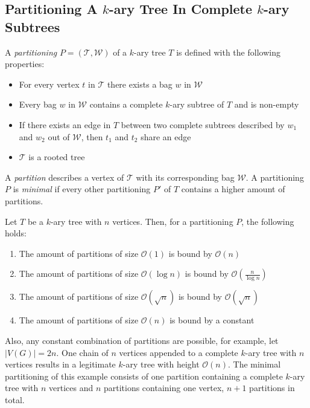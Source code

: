 \subsection{Partitioning A $k$-ary Tree In Complete $k$-ary Subtrees}
\begin{definition}
	A \emph{partitioning} $P = (\mathcal{T},\mathcal{W})$ of a $k$-ary tree $T$ is defined with the following properties:
	\begin{itemize}
		\item For every vertex $t$ in $\mathcal{T}$ there exists a bag $w$ in $\mathcal{W}$
		\item Every bag $w$ in $\mathcal{W}$ contains a complete $k$-ary subtree of $T$ and is non-empty
		\item If there exists an edge in $T$ between two complete subtrees described by $w_1$ and $w_2$ out of $\mathcal{W}$, then $t_1$ and $t_2$ share an edge
		\item $\mathcal{T}$ is a rooted tree		
	\end{itemize}
	A \emph{partition} describes a vertex of $\mathcal{T}$ with its corresponding bag $\mathcal{W}$. A partitioning $P$ is \emph{minimal} if every other partitioning $P'$ of $T$ contains a higher amount of partitions.
\end{definition}
Let $T$ be a $k$-ary tree with $n$ vertices. Then, for a partitioning $P$, the following holds:
\begin{enumerate}
	\item The amount of partitions of size $\mathcal{O}(1)$ is bound by $\mathcal{O}(n)$
	\item The amount of partitions of size $\mathcal{O}(\log n)$ is bound by $\mathcal{O}\left(\frac{n}{\log n}\right)$
	\item The amount of partitions of size $\mathcal{O}(\sqrt{n})$ is bound by $\mathcal{O}(\sqrt{n})$
	\item The amount of partitions of size $\mathcal{O}(n)$ is bound by a constant
\end{enumerate}
Also, any constant combination of partitions are possible, for example, let $|V(G)| = 2n$. One chain of $n$ vertices appended to a complete $k$-ary tree with $n$ vertices results in a legitimate $k$-ary tree with height $\mathcal{O}(n)$. The minimal partitioning of this example consists of one partition containing a complete $k$-ary tree with $n$ vertices and $n$ partitions containing one vertex, $n+1$ partitions in total.
